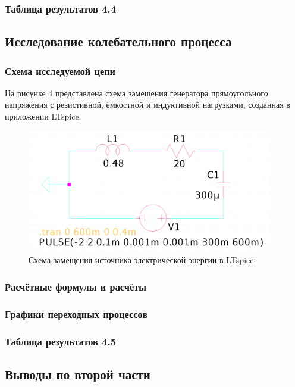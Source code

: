\subsubsection{Таблица результатов 4.4}




\subsection{Исследование колебательного процесса}

\subsubsection{Схема исследуемой цепи}
На рисунке 4 представлена схема замещения генератора прямоугольного напряжения с резистивной, ёмкостной и индуктивной нагрузками, созданная в приложении LTspice.

\begin{figure}[H]
	\centering
	\includegraphics[width=0.96\textwidth]{./data/rcl_2-schema.png}
	\caption{Схема замещения источника электрической энергии в LTspice.}
\end{figure}

\subsubsection{Расчётные формулы и расчёты}

\subsubsection{Графики переходных процессов}


\subsubsection{Таблица результатов 4.5}

\subsection{Выводы по второй части}
